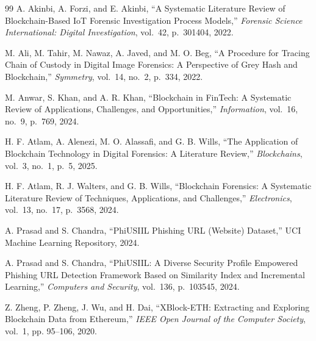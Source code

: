 \documentclass[conference]{IEEEtran}
\begin{document}
\begin{thebibliography}{99}
A. Akinbi, A. Forzi, and E. Akinbi, ``A Systematic Literature Review of Blockchain-Based IoT Forensic Investigation Process Models,'' \textit{Forensic Science International: Digital Investigation}, vol.~42, p.~301404, 2022.

M. Ali, M. Tahir, M. Nawaz, A. Javed, and M. O. Beg, ``A Procedure for Tracing Chain of Custody in Digital Image Forensics: A Perspective of Grey Hash and Blockchain,'' \textit{Symmetry}, vol.~14, no.~2, p.~334, 2022.

M. Anwar, S. Khan, and A. R. Khan, ``Blockchain in FinTech: A Systematic Review of Applications, Challenges, and Opportunities,'' \textit{Information}, vol.~16, no.~9, p.~769, 2024.

H. F. Atlam, A. Alenezi, M. O. Alassafi, and G. B. Wills, ``The Application of Blockchain Technology in Digital Forensics: A Literature Review,'' \textit{Blockchains}, vol.~3, no.~1, p.~5, 2025.

H. F. Atlam, R. J. Walters, and G. B. Wills, ``Blockchain Forensics: A Systematic Literature Review of Techniques, Applications, and Challenges,'' \textit{Electronics}, vol.~13, no.~17, p.~3568, 2024.

A. Prasad and S. Chandra, ``PhiUSIIL Phishing URL (Website) Dataset,'' UCI Machine Learning Repository, 2024.

A. Prasad and S. Chandra, ``PhiUSIIL: A Diverse Security Profile Empowered Phishing URL Detection Framework Based on Similarity Index and Incremental Learning,'' \textit{Computers and Security}, vol.~136, p.~103545, 2024.

Z. Zheng, P. Zheng, J. Wu, and H. Dai, ``XBlock-ETH: Extracting and Exploring Blockchain Data from Ethereum,'' \textit{IEEE Open Journal of the Computer Society}, vol.~1, pp. 95–106, 2020.

\end{thebibliography}
\end{document}
